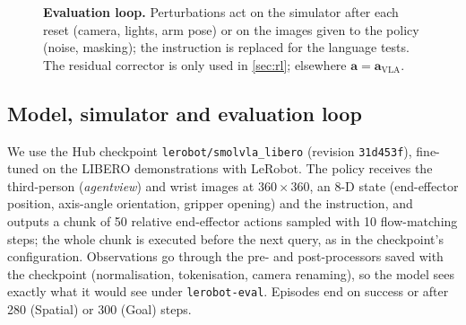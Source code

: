 \documentclass[10pt,twocolumn,letterpaper]{article}
\begin{document}
\begin{figure}[t]
\centering
{}
\caption{\textbf{Evaluation loop.} Perturbations act on the simulator after each reset (camera, lights,
arm pose) or on the images given to the policy (noise, masking); the instruction is replaced for the
language tests. The residual corrector is only used in \cref{sec:rl}; elsewhere $\bm a=\bm a_\mathrm{VLA}$.}
\label{fig:pipeline}
\end{figure}

\subsection{Model, simulator and evaluation loop}
We use the Hub checkpoint \texttt{lerobot/smolvla\_libero} (revision \texttt{31d453f}), fine-tuned on the
LIBERO demonstrations with LeRobot. The policy receives the third-person (\emph{agentview}) and wrist images at
$360\times360$, an 8-D state (end-effector position, axis-angle orientation, gripper opening) and the
instruction, and outputs a chunk of 50 relative end-effector actions sampled with 10 flow-matching steps;
the whole chunk is executed before the next query, as in the checkpoint's configuration. Observations go
through the pre- and post-processors saved with the checkpoint (normalisation, tokenisation, camera renaming),
so the model sees exactly what it would see under \texttt{lerobot-eval}. Episodes end on success or after
280 (Spatial) or 300 (Goal) steps.
\end{document}
